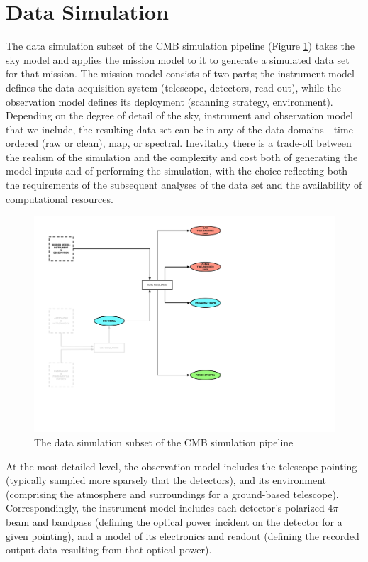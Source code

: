 
\section{Data Simulation}

The data simulation subset of the CMB simulation pipeline (Figure \ref{fig_ds}) takes the sky model and applies the mission model to it to generate a simulated data set for that mission. The mission model consists of two parts; the instrument model defines the data acquisition system (telescope, detectors, read-out), while the observation model defines its deployment (scanning strategy, environment). Depending on the degree of detail of the sky, instrument and observation model that we include, the resulting data set can be in any of the data domains - time-ordered (raw or clean), map, or spectral. Inevitably there is a trade-off between the realism of the simulation and the complexity and cost both of generating the model inputs and of performing the simulation, with the choice reflecting both the requirements of the subsequent analyses of the data set and the availability of computational resources.

\begin{figure}[htbp]
\centering
\includegraphics[width=1\textwidth]{Analysis/ds}
\caption{The data simulation subset of the CMB simulation pipeline}
\label{fig_ds}
\end{figure}

At the most detailed level, the observation model includes the telescope pointing (typically sampled more sparsely that the detectors), and its environment (comprising the atmosphere and surroundings for a ground-based telescope). Correspondingly, the instrument model includes each detector's polarized $4 \pi$-beam and bandpass (defining the optical power incident on the detector for a given pointing), and a model of its electronics and readout (defining the recorded output data resulting from that optical power).

